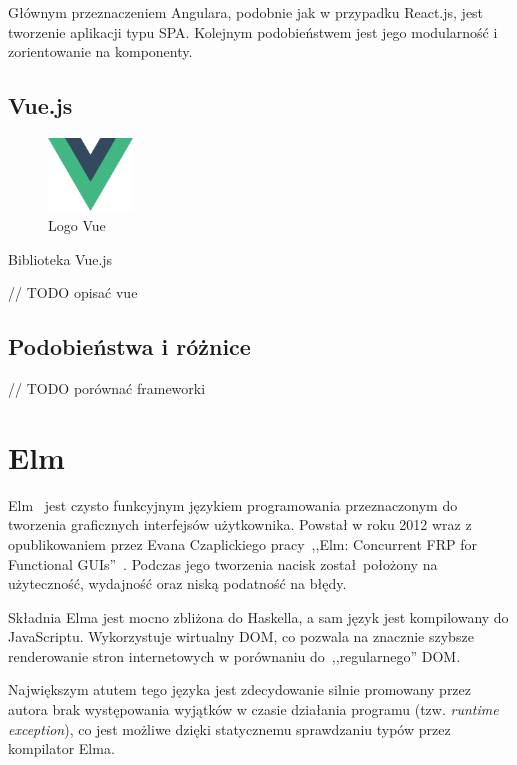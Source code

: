 \documentclass[twoside,a4paper]{report}
\begin{document}
Głównym przeznaczeniem Angulara, podobnie jak w przypadku React.js, jest tworzenie aplikacji typu SPA\@.
Kolejnym podobieństwem jest jego modularność i zorientowanie na komponenty.

\section{Vue.js}
\begin{figure}
    \centering
    \includegraphics[width=0.2\textwidth]{img/logo_vue.png}
    \caption*{Logo Vue}\label{fig:logo_vue}
\end{figure}
Biblioteka Vue.js~\cite{vuejsdocs}

// TODO opisać vue

\section{Podobieństwa i różnice}

// TODO porównać frameworki


\chapter{Elm}
Elm~\cite{elmdocs} jest czysto funkcyjnym językiem programowania przeznaczonym do tworzenia graficznych interfejsów użytkownika.
Powstał w roku 2012 wraz z opublikowaniem przez Evana Czaplickiego pracy~,,Elm: Concurrent FRP for Functional GUIs''~\cite{Czaplicki2012ElmC}.
Podczas jego tworzenia nacisk został położony na użyteczność, wydajność oraz niską podatność na błędy.

Składnia Elma jest mocno zbliżona do Haskella, a sam język jest kompilowany do JavaScriptu.
Wykorzystuje wirtualny DOM, co pozwala na znacznie szybsze renderowanie stron internetowych w porównaniu do~,,regularnego'' DOM\@.

Największym atutem tego języka jest zdecydowanie silnie promowany przez autora brak występowania wyjątków w czasie działania programu (tzw. \textit{runtime exception}), co jest możliwe dzięki statycznemu sprawdzaniu typów przez kompilator Elma.
\end{document}
